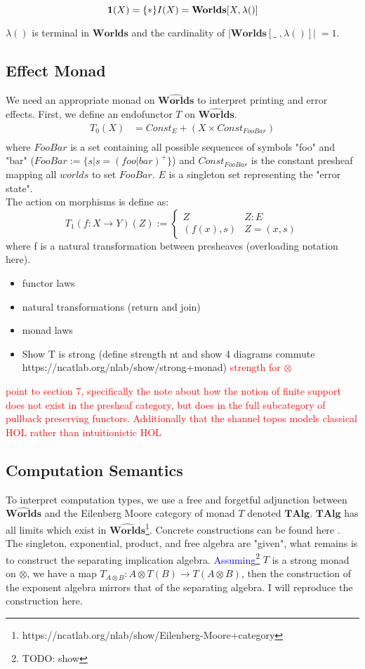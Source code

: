 \documentclass{article}
\newcommand{\blue}[1]{\textcolor{blue}{#1}}
\newcommand{\red}[1]{\textcolor{red}{#1}}
\newcommand{\worlds}{\widehat{\mathbf{Worlds}}}
\begin{document}
\[ 
    \mathbf{1}(X) = \{*\} \\
    I(X) = \mathbf{Worlds}[X , \lambda()]
\]

$\lambda()$ is terminal in $\mathbf{Worlds}$ and the cardinality of $|\mathbf{Worlds}[\_\;,\lambda()]| \;= 1$.
\subsection{Effect Monad}
We need an appropriate monad on $\worlds$ to interpret printing and error effects. First, we define an endofunctor $T$ on $\worlds$.
\begin{align*}
    T_0(X) &= Const_E + (X \times Const_{FooBar})\\
\end{align*}
where $FooBar$ is a set containing all possible sequences of symbols "foo" and "bar" ($FooBar := \{s | s = (foo | bar)^+\}$) and $Const_{FooBar}$ is the constant presheaf mapping all $worlds$ to set $FooBar$. $E$ is a singleton set representing the "error state".
\\
The action on morphisms is define as: 
\[ 
T_1(f: X \rightarrow Y)(Z) :=\begin{cases} 
      Z & Z: E \\
      (f(x), s) & Z = (x,s)
      \end{cases}
\]
where f is a natural transformation between presheaves (overloading notation here).
\begin{itemize}
    \item functor laws
    \item natural transformations (return and join)
    \item monad laws
    \item Show T is strong (define strength nt and show 4 diagrams commute https://ncatlab.org/nlab/show/strong+monad) \red{strength for $\otimes$}
\end{itemize}
\red{\cite{gabbayNewApproachAbstract2002} point to section 7, specifically 
the note about how the notion of finite support does not exist in the presheaf category, but does in the
full subcategory of pullback preserving functors. Additionally that the shanuel topos models 
classical HOL rather than intuitionistic HOL}

\subsection{Computation Semantics}
To interpret computation types, we use a free and forgetful adjunction between $\worlds$ and the Eilenberg Moore category of monad $T$ denoted $\mathbf{TAlg}$. $\mathbf{TAlg}$ has all limits which exist in $\worlds$\footnote{https://ncatlab.org/nlab/show/Eilenberg-Moore+category}. Concrete constructions can be found here \cite{forster_call-by-push-value_2019}. The singleton, exponential, product, and free algebra are "given", what remains is to construct the separating implication algebra. 
\blue{Assuming}\footnote{TODO: show} $T$ is a strong monad on $\otimes$, we have a map $T_{A \otimes B} : A \otimes T(B) \rightarrow T(A \otimes B)$, then the construction of the exponent algebra mirrors that of the separating algebra. I will reproduce the construction here.
\end{document}
